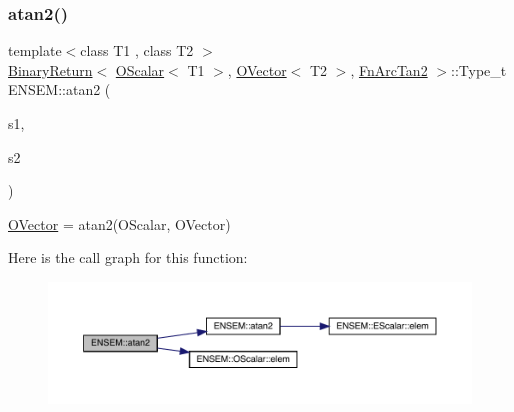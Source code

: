 \subsubsection{\texorpdfstring{atan2()}{atan2()}\hspace{0.1cm}{\footnotesize\ttfamily [3/3]}}
{\footnotesize\ttfamily template$<$class T1 , class T2 $>$ \\
\mbox{\hyperlink{structENSEM_1_1BinaryReturn}{Binary\+Return}}$<$ \mbox{\hyperlink{classENSEM_1_1OScalar}{O\+Scalar}}$<$ T1 $>$, \mbox{\hyperlink{classENSEM_1_1OVector}{O\+Vector}}$<$ T2 $>$, \mbox{\hyperlink{structENSEM_1_1FnArcTan2}{Fn\+Arc\+Tan2}} $>$\+::Type\+\_\+t E\+N\+S\+E\+M\+::atan2 (\begin{DoxyParamCaption}\item[{const \mbox{\hyperlink{classENSEM_1_1OScalar}{O\+Scalar}}$<$ T1 $>$ \&}]{s1,  }\item[{const \mbox{\hyperlink{classENSEM_1_1OVector}{O\+Vector}}$<$ T2 $>$ \&}]{s2 }\end{DoxyParamCaption})\hspace{0.3cm}{\ttfamily [inline]}}



\mbox{\hyperlink{classENSEM_1_1OVector}{O\+Vector}} = atan2(\+O\+Scalar, O\+Vector) 

Here is the call graph for this function\+:\nopagebreak
\begin{figure}[H]
\begin{center}
\leavevmode
\includegraphics[width=350pt]{da/d59/group__obsvector_gaf9e56538a48f9abad6df1dda8297795b_cgraph}
\end{center}
\end{figure}
\mbox{\label{group__obsvector_ga363734253f08749647255a90c647284c}} 
